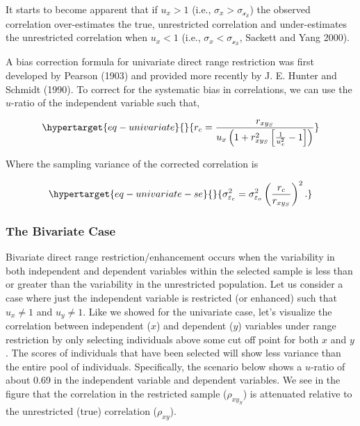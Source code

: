 \documentclass[
  letterpaper,
  DIV=11,
  numbers=noendperiod]{scrreprt}
\begin{document}
It starts to become apparent that if \(u_x>1\) (i.e.,
\(\sigma_x>\sigma_\mathcal{x_S}\)) the observed correlation
over-estimates the true, unrestricted correlation and under-estimates
the unrestricted correlation when \(u_x<1\) (i.e.,
\(\sigma_x<\sigma_\mathcal{x_S}\), Sackett and Yang 2000).

A bias correction formula for univariate direct range restriction was
first developed by Pearson (1903) and provided more recently by J. E.
Hunter and Schmidt (1990). To correct for the systematic bias in
correlations, we can use the \(u\)-ratio of the independent variable
such that,

\begin{equation}\protect\hypertarget{eq-univariate}{}{
r_c = \frac{r_{xy_S}}{u_x\left(1+r_{xy_S}^2\left[\frac{1}{u^2_x}-1\right]\right)}
}\label{eq-univariate}\end{equation}

Where the sampling variance of the corrected correlation is

\begin{equation}\protect\hypertarget{eq-univariate-se}{}{
\sigma^2_{\varepsilon_c} = \sigma^2_{\varepsilon_o}\left(\frac{r_c}{r_{xy_S}}\right)^2.
}\label{eq-univariate-se}\end{equation}

\hypertarget{the-bivariate-case-1}{%
\subsubsection{The Bivariate Case}\label{the-bivariate-case-1}}

Bivariate direct range restriction/enhancement occurs when the
variability in both independent and dependent variables within the
selected sample is less than or greater than the variability in the
unrestricted population. Let us consider a case where just the
independent variable is restricted (or enhanced) such that \(u_x\neq 1\)
and \(u_y \neq 1\). Like we showed for the univariate case, let's
visualize the correlation between independent (\(x\)) and dependent
(\(y\)) variables under range restriction by only selecting individuals
above some cut off point for both \(x\) and \(y\). The scores of
individuals that have been selected will show less variance than the
entire pool of individuals. Specifically, the scenario below shows a
\(u\)-ratio of about 0.69 in the independent variable and dependent
variables. We see in the figure that the correlation in the restricted
sample (\(\rho_{xy_S}\)) is attenuated relative to the unrestricted
(true) correlation (\(\rho_{xy}\)).
\end{document}
